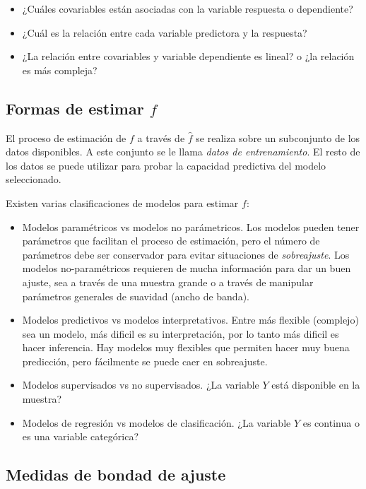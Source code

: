 \documentclass[
  12pt,
]{book}
\providecommand{\tightlist}{%
  \setlength{\itemsep}{0pt}\setlength{\parskip}{0pt}}
\theoremstyle{definition}
\theoremstyle{definition}
\theoremstyle{definition}
\theoremstyle{definition}
\theoremstyle{remark}
\begin{document}
\begin{itemize}
\tightlist
\item
  ¿Cuáles covariables están asociadas con la variable respuesta o dependiente?
\item
  ¿Cuál es la relación entre cada variable predictora y la respuesta?
\item
  ¿La relación entre covariables y variable dependiente es lineal? o ¿la relación es más compleja?
\end{itemize}

\hypertarget{formas-de-estimar-f}{%
\subsection{\texorpdfstring{Formas de estimar \(f\)}{Formas de estimar f}}\label{formas-de-estimar-f}}

El proceso de estimación de \(f\) a través de \(\hat f\) se realiza sobre un subconjunto de los datos disponibles. A este conjunto se le llama \emph{datos de entrenamiento}. El resto de los datos se puede utilizar para probar la capacidad predictiva del modelo seleccionado.

Existen varias clasificaciones de modelos para estimar \(f\):

\begin{itemize}
\tightlist
\item
  Modelos paramétricos vs modelos no parámetricos. Los modelos pueden tener parámetros que facilitan el proceso de estimación, pero el número de parámetros debe ser conservador para evitar situaciones de \emph{sobreajuste}. Los modelos no-paramétricos requieren de mucha información para dar un buen ajuste, sea a través de una muestra grande o a través de manipular parámetros generales de suavidad (ancho de banda).
\item
  Modelos predictivos vs modelos interpretativos. Entre más flexible (complejo) sea un modelo, más dificil es su interpretación, por lo tanto más dificil es hacer inferencia. Hay modelos muy flexibles que permiten hacer muy buena predicción, pero fácilmente se puede caer en sobreajuste.
\item
  Modelos supervisados vs no supervisados. ¿La variable \(Y\) está disponible en la muestra?
\item
  Modelos de regresión vs modelos de clasificación. ¿La variable \(Y\) es continua o es una variable categórica?
\end{itemize}

\hypertarget{medidas-de-bondad-de-ajuste}{%
\subsection{Medidas de bondad de ajuste}\label{medidas-de-bondad-de-ajuste}}
\end{document}
